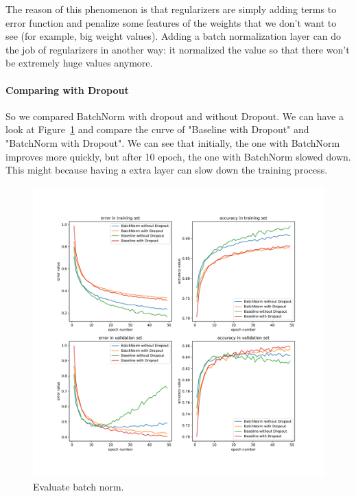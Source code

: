 \documentclass{article}
\begin{document}
The reason of this phenomenon is that regularizers are simply adding terms to error function and penalize some features of the weights that we don't want to see (for example, big weight values). Adding a batch normalization layer can do the job of regularizers in another way: it normalized the value so that there won't be extremely huge values anymore.


\paragraph{Comparing with Dropout} So we compared BatchNorm with dropout and without Dropout. We can have a look at Figure~\ref{fig:batchnorm} and compare the curve of "Baseline with Dropout" and "BatchNorm with Dropout". We can see that initially, the one with BatchNorm improves more quickly, but after 10 epoch, the one with BatchNorm slowed down. This might because having a extra layer can slow down the training process. %





\begin{figure}[tb]
\begin{center}
\centerline{\includegraphics[width=\columnwidth]{fig/batchnorm.pdf}}
\caption{Evaluate batch norm.}
\label{fig:batchnorm}
\end{center}
\end{figure} 
\end{document}
